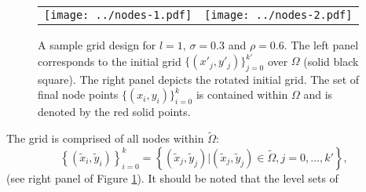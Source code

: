\begin{figure}
  \centering
  \begin{tabular}{cc}
    \begin{minipage}{0.4\textwidth}
      \centering
      \texttt{[image: ../nodes-1.pdf]}
    \end{minipage}
    & \begin{minipage}{0.4\textwidth}
      \centering
      \texttt{[image: ../nodes-2.pdf]}
    \end{minipage}
  \end{tabular}
  \caption{A sample grid design for $l=1$, $\sigma=0.3$ and $\rho=0.6$. The
    left panel corresponds to the initial grid
    $\{ (x'_j,y'_j) \}_{j=0}^{k'}$ over $\Omega$ (solid black
    square). The right panel depicts the rotated initial grid. The set
    of final node points $\{ (x_i,y_i) \}_{i=0}^{k}$ is contained
    within $\Omega$ and is denoted by the red solid points.}
  \label{fig:grids}
\end{figure}
The grid is comprised of all nodes within $\tilde{\Omega}$:
\[\left\{(\tilde{x}_i, \tilde{y}_i)\right\}_{i=0}^k = \left\{
    (\tilde{x}_j, \tilde{y}_j) | (\tilde{x}_j, \tilde{y}_j) \in
    \tilde{\Omega}, j = 0, \ldots, k' \right\}, \] (see right panel of
Figure \ref{fig:grids}). It should be noted that the level sets of

